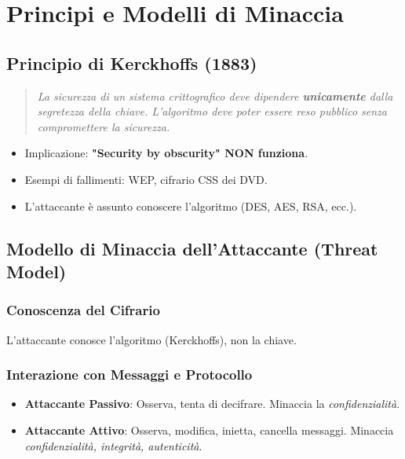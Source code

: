 \section{Principi e Modelli di Minaccia}

\subsection{Principio di Kerckhoffs (1883)}
\blockquote{\textit{La sicurezza di un sistema crittografico deve dipendere \textbf{unicamente} dalla segretezza della chiave. L'algoritmo deve poter essere reso pubblico senza compromettere la sicurezza.}}
\begin{itemize}
    \item Implicazione: \textbf{"Security by obscurity" NON funziona}.
    \item Esempi di fallimenti: WEP, cifrario CSS dei DVD.
    \item L'attaccante è assunto conoscere l'algoritmo (DES, AES, RSA, ecc.).
\end{itemize}

\subsection{Modello di Minaccia dell'Attaccante (Threat Model)}
\subsubsection{Conoscenza del Cifrario}
L'attaccante conosce l'algoritmo (Kerckhoffs), non la chiave.

\subsubsection{Interazione con Messaggi e Protocollo}
\begin{itemize}
    \item \textbf{Attaccante Passivo}: Osserva, tenta di decifrare. Minaccia la \textit{confidenzialità}.
    \item \textbf{Attaccante Attivo}: Osserva, modifica, inietta, cancella messaggi. Minaccia \textit{confidenzialità, integrità, autenticità}.
\end{itemize}

